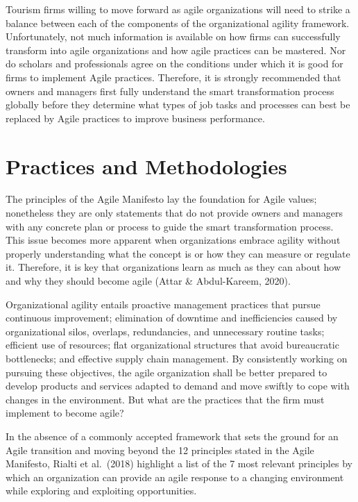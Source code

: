 \documentclass[
  letterpaper,
  DIV=11,
  numbers=noendperiod]{scrreprt}
\begin{document}
Tourism firms willing to move forward as agile organizations will need
to strike a balance between each of the components of the organizational
agility framework. Unfortunately, not much information is available on
how firms can successfully transform into agile organizations and how
agile practices can be mastered. Nor do scholars and professionals agree
on the conditions under which it is good for firms to implement Agile
practices. Therefore, it is strongly recommended that owners and
managers first fully understand the smart transformation process
globally before they determine what types of job tasks and processes can
best be replaced by Agile practices to improve business performance.

\hypertarget{practices-and-methodologies}{%
\section{Practices and
Methodologies}\label{practices-and-methodologies}}

The principles of the Agile Manifesto lay the foundation for Agile
values; nonetheless they are only statements that do not provide owners
and managers with any concrete plan or process to guide the smart
transformation process. This issue becomes more apparent when
organizations embrace agility without properly understanding what the
concept is or how they can measure or regulate it. Therefore, it is key
that organizations learn as much as they can about how and why they
should become agile (Attar \& Abdul-Kareem, 2020).

Organizational agility entails proactive management practices that
pursue continuous improvement; elimination of downtime and
inefficiencies caused by organizational silos, overlaps, redundancies,
and unnecessary routine tasks; efficient use of resources; flat
organizational structures that avoid bureaucratic bottlenecks; and
effective supply chain management. By consistently working on pursuing
these objectives, the agile organization shall be better prepared to
develop products and services adapted to demand and move swiftly to cope
with changes in the environment. But what are the practices that the
firm must implement to become agile?

In the absence of a commonly accepted framework that sets the ground for
an Agile transition and moving beyond the 12 principles stated in the
Agile Manifesto, Rialti et al.~(2018) highlight a list of the 7 most
relevant principles by which an organization can provide an agile
response to a changing environment while exploring and exploiting
opportunities.
\end{document}
